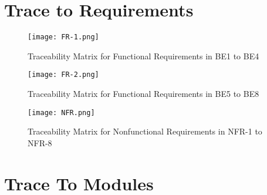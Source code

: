 \documentclass[12pt, titlepage]{article}
\begin{document}
\section{Trace to Requirements}

\begin{figure}[H]
    \centering
    \texttt{[image: FR-1.png]}
    \caption{Traceability Matrix for Functional Requirements in BE1 to BE4}
    \label{fig:my_label}
\end{figure}

\begin{figure}[H]
    \centering
    \texttt{[image: FR-2.png]}
    \caption{Traceability Matrix for Functional Requirements in BE5 to BE8}
    \label{fig:my_label}
\end{figure}

\begin{figure}[H]
    \centering
    \texttt{[image: NFR.png]}
    \caption{Traceability Matrix for Nonfunctional Requirements in NFR-1 to NFR-8}
    \label{fig:my_label}
\end{figure}

\section{Trace To Modules}
\end{document}
